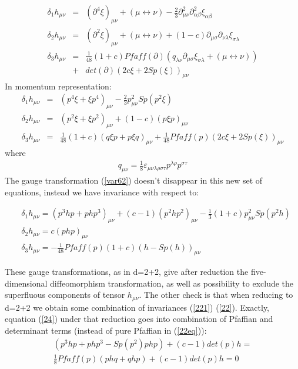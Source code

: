 \documentclass[a4paper,12pt]{article}
\begin{document}
\begin{eqnarray}
\delta _1 h_{\mu \nu }  &=& (\partial ^4 \xi)_{\mu \nu }  + (\mu
\leftrightarrow \nu ) - \frac{2}{3}\partial ^2 _{\mu \nu }
\partial ^2 _{\alpha \beta } \xi_{\alpha \beta }\\
\delta _2 h_{\mu \nu }  &=& (\partial ^2 \xi)_{\mu \nu }  +
(\mu  \leftrightarrow \nu ) + (1 - c)\partial _{\mu \sigma }
\partial _{\nu \lambda } \xi_{\sigma \lambda }  \\
\delta _3 h_{\mu \nu }  &=& \frac {1}{48}(1 +
c)Pfaff(\partial)(q_{\lambda \nu } \partial _{\mu \sigma }
\xi_{\sigma \lambda }  + (\mu  \leftrightarrow \nu
))\nonumber\\&+& det(\partial)(2c\xi +
 2Sp(\xi))_{\mu \nu }
\end{eqnarray}
In momentum representation:
\begin{eqnarray}
 \delta _1 h_{\mu \nu }  &=& (p^4 \xi+\xi p^4 )_{\mu \nu }  - \frac{2}{3}p^2 _{\mu \nu } Sp(p^2 \xi) \\
 \delta _2 h_{\mu \nu }  &=& (p^2 \xi + \xi p^2 )_{\mu \nu }  + (1 - c)(p\xi p)_{\mu \nu }  \\
 \delta _3 h_{\mu \nu }  &=& \frac {1}{48}(1 + c)(q\xi p + p\xi q)_{\mu \nu } + \frac {1}{48} Pfaff(p)(2c\xi + 2Sp(\xi))_{\mu \nu }
\end{eqnarray}
where
\begin{eqnarray}
q_{\mu \nu }= \frac{1}{8}\varepsilon _{\mu \nu \lambda \rho \sigma
\tau }p^{\lambda \rho}p^{\sigma \tau}
\end{eqnarray}
 The gauge transformation (\ref{var62}) doesn't disappear in
this new set of equations, instead we have invariance with respect
to:

\begin{eqnarray}
&\delta _1 h_{\mu \nu } = (p^3 hp+php^3 )_{\mu \nu}+(c-1)(p^2 hp^2 )_{\mu \nu }  - \frac{1}{3}(1 + c)p^2 _{\mu \nu } Sp(p^2 h) \\
&\delta _2 h_{\mu \nu}  = c(php)_{\mu \nu }  \\
&\delta_3 h_{\mu \nu}  = - \frac {1}{48}Pfaff(p)(1 + c)(h -
Sp(h))_{\mu \nu }
 \end{eqnarray}

These gauge transformations, as in d=2+2, give after reduction the
five-dimensional diffeomorphism transformation, as well as
possibility to exclude the superfluous components of tensor
$h_{\mu\nu}$. The other check is that when  reducing to d=2+2 we
obtain some combination of invariances (\ref{221}) (\ref{22}).
Exactly, equation (\ref{24}) under that reduction goes into
combination of Pfaffian and determinant terms (instead of pure
Pfaffian in (\ref{22eq})):
\begin{equation}
\begin{array}{l}
(p^3 hp + php^3  - Sp(p^2 )php)+(c-1)det(p)h=\\
\frac{1}{8}Pfaff(p)(phq+qhp)+(c-1)det(p)h =0 \label{red}
\end{array}
\end{equation}
\end{document}
